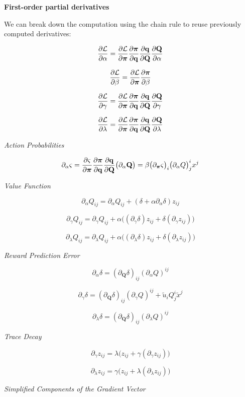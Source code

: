 \textbf{First-order partial derivatives}

We can break down the computation using the chain rule to reuse
previously computed derivatives:

\[
\frac{\partial \mathcal L}{\partial \alpha}  = \frac{\partial \mathcal L}{\partial \boldsymbol\pi} \frac{\partial \boldsymbol\pi}{\partial \mathbf q} \frac{\partial \mathbf q}{\partial \mathbf Q} \frac{\partial \mathbf Q}{\partial \alpha}
\]

\[
\frac{\partial \mathcal L}{\partial \beta}   = \frac{\partial \mathcal L}{\partial \boldsymbol\pi} \frac{\partial \boldsymbol\pi}{\partial \beta}
\]

\[
\frac{\partial \mathcal L}{\partial \gamma}  = \frac{\partial \mathcal L}{\partial \boldsymbol\pi} \frac{\partial \boldsymbol\pi}{\partial \mathbf q} \frac{\partial \mathbf q}{\partial \mathbf Q} \frac{\partial \mathbf Q}{\partial \gamma}
\]

\[
\frac{\partial \mathcal L}{\partial \lambda} = \frac{\partial \mathcal L}{\partial \boldsymbol\pi} \frac{\partial \boldsymbol\pi}{\partial \mathbf q} \frac{\partial \mathbf q}{\partial \mathbf Q} \frac{\partial \mathbf Q}{\partial \lambda}
\]

\emph{Action Probabilities}

\[
\partial_\alpha \varsigma = \frac{\partial \varsigma}{\partial \boldsymbol\pi} \frac{\partial \boldsymbol\pi}{\partial \mathbf q} \frac{\partial \mathbf q}{\partial \mathbf Q} \big( \partial_\alpha \mathbf Q \big) = \beta \big(\partial_{\boldsymbol\pi} \varsigma \big)_i \big( \partial_\alpha Q \big)^i_j x^j
\]

\emph{Value Function}

\[
\partial_\alpha Q_{ij} =  \partial_\alpha Q_{ij} + (\delta + \alpha \partial_\alpha \delta) z_{ij}
\]

\[
\partial_\gamma Q_{ij} =  \partial_\gamma Q_{ij} + \alpha \big( (\partial_\gamma \delta) z_{ij} + \delta (\partial_\gamma z_{ij}) \big)
\]

\[
\partial_\lambda Q_{ij} =  \partial_\lambda Q_{ij} + \alpha \big( (\partial_\lambda \delta) z_{ij} + \delta (\partial_\lambda z_{ij}) \big)
\]

\emph{Reward Prediction Error}

\[
\partial_\alpha \delta = (\partial_{\mathbf Q} \delta)_{ij} (\partial_\alpha Q)^{ij}
\]

\[
\partial_\gamma \delta = (\partial_{\mathbf Q} \delta)_{ij} (\partial_\gamma Q)^{ij} + \tilde{u}_i Q^i_j \tilde{x}^j
\]

\[
\partial_\lambda \delta = (\partial_{\mathbf Q} \delta)_{ij} (\partial_\lambda Q)^{ij}
\]

\emph{Trace Decay}

\[
\partial_\gamma z_{ij} = \lambda \big(z_{ij} + \gamma (\partial_\gamma z_{ij}) \big)
\]

\[
\partial_\lambda z_{ij} = \gamma \big(z_{ij} + \lambda (\partial_\lambda z_{ij}) \big)
\]

\emph{Simplified Components of the Gradient Vector}

